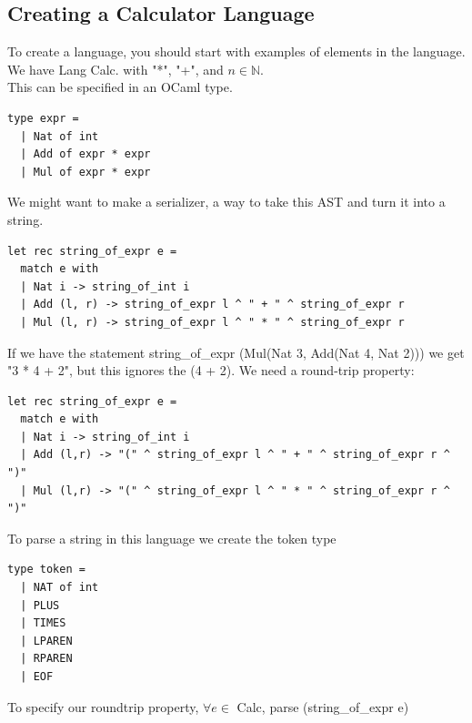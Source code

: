 \subsection{Creating a Calculator Language}
To create a language, you should start with examples of elements in the language.
\\
We have Lang Calc. with "*", "+", and $n \in \mathbb{N}$. 
\\
This can be specified in an OCaml type.
\begin{lstlisting}
type expr =
  | Nat of int
  | Add of expr * expr
  | Mul of expr * expr
\end{lstlisting}
We might want to make a serializer, a way to take this AST and turn it into a string.
\begin{lstlisting}
let rec string_of_expr e =
  match e with
  | Nat i -> string_of_int i
  | Add (l, r) -> string_of_expr l ^ " + " ^ string_of_expr r
  | Mul (l, r) -> string_of_expr l ^ " * " ^ string_of_expr r
\end{lstlisting}
If we have the statement string_of_expr (Mul(Nat 3, Add(Nat 4, Nat 2))) we get "3 * 4 + 2", but this ignores the (4 + 2). We need a round-trip property: 
\begin{lstlisting}
let rec string_of_expr e =
  match e with
  | Nat i -> string_of_int i
  | Add (l,r) -> "(" ^ string_of_expr l ^ " + " ^ string_of_expr r ^ ")"
  | Mul (l,r) -> "(" ^ string_of_expr l ^ " * " ^ string_of_expr r ^ ")"
\end{lstlisting}
\newpage
To parse a string in this language we create the token type
\begin{lstlisting}
type token =
  | NAT of int
  | PLUS
  | TIMES
  | LPAREN
  | RPAREN
  | EOF
\end{lstlisting}
To specify our roundtrip property, $\forall e \in$ Calc, parse (string_of_expr e)